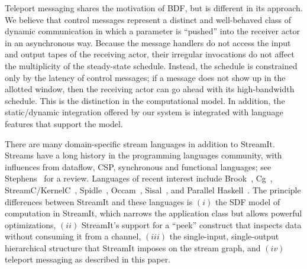 Teleport messaging shares the motivation of BDF, but is different in
its approach.  We believe that control messages represent a distinct
and well-behaved class of dynamic communication in which a parameter
is ``pushed'' into the receiver actor in an asynchronous way.  Because
the message handlers do not access the input and output tapes of the
receiving actor, their irregular invocations do not affect the
multiplicity of the steady-state schedule.  Instead, the schedule is
constrained only by the latency of control messages; if a message does
not show up in the allotted window, then the receiving actor can go
ahead with its high-bandwidth schedule.  This is the distinction in
the computational model.  In addition, the static/dynamic integration
offered by our system is integrated with language features that
support the model.

There are many domain-specific stream languages in addition to
StreamIt.  Streams have a long history in the programming languages
community, with influences from dataflow, CSP, synchronous and
functional languages; see Stephens~\cite{survey97} for a review.
Languages of recent interest include Brook~\cite{brook04},
Cg~\cite{cg03}, StreamC/KernelC~\cite{imagine03ieee},
Spidle~\cite{spidle02}, Occam~\cite{occammanual}, Sisal~\cite{sisal},
and Parallel Haskell~\cite{ph}.  The principle differences between
StreamIt and these languages is $(i)$ the SDF model of computation in
StreamIt, which narrows the application class but allows powerful
optimizations, $(ii)$ StreamIt's support for a ``peek'' construct that
inspects data without consuming it from a channel, $(iii)$ the
single-input, single-output hierarchical structure that StreamIt
imposes on the stream graph, and $(iv)$ teleport messaging as
described in this paper.
